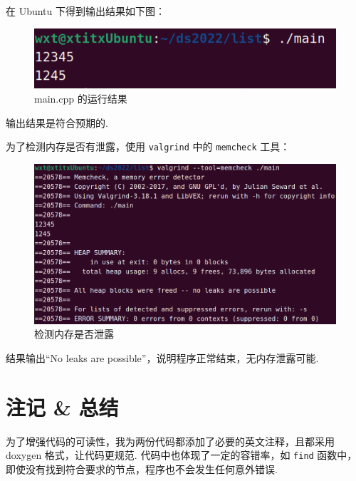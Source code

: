 \documentclass[UTF8]{ctexart}
\begin{document}
在 Ubuntu 下得到输出结果如下图：

\begin{figure}[H]
    \centering
    \includegraphics[scale=0.8]{figures/1.png}
    \caption{main.cpp 的运行结果}
\end{figure}

输出结果是符合预期的.

为了检测内存是否有泄露，使用 \verb|valgrind| 中的 \verb|memcheck| 工具：

\begin{figure}[H]
    \centering
    \includegraphics[scale=0.5]{figures/2.png}
    \caption{检测内存是否泄露}
\end{figure}

结果输出“No leaks are possible”，说明程序正常结束，无内存泄露可能.

\section{注记 \& 总结}

为了增强代码的可读性，我为两份代码都添加了必要的英文注释，且都采用 doxygen 格式，让代码更规范. 代码中也体现了一定的容错率，如 \verb|find| 函数中，即使没有找到符合要求的节点，程序也不会发生任何意外错误.
\end{document}
